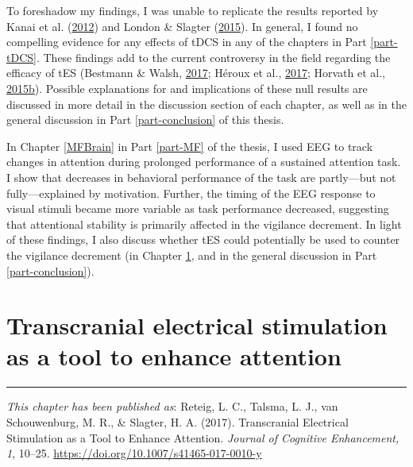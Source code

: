 \documentclass[11pt,]{memoir}
\begin{document}
To foreshadow my findings, I was unable to replicate the results reported by Kanai et al. (\protect\hyperlink{ref-Kanai2012}{2012}) and London \& Slagter (\protect\hyperlink{ref-London2015}{2015}). In general, I found no compelling evidence for any effects of tDCS in any of the chapters in Part \ref{part-tDCS}. These findings add to the current controversy in the field regarding the efficacy of tES (Bestmann \& Walsh, \protect\hyperlink{ref-Bestmann2017}{2017}; Héroux et al., \protect\hyperlink{ref-Heroux2017}{2017}; Horvath et al., \protect\hyperlink{ref-Horvath2015b}{2015}\protect\hyperlink{ref-Horvath2015b}{b}). Possible explanations for and implications of these null results are discussed in more detail in the discussion section of each chapter, as well as in the general discussion in Part \ref{part-conclusion} of this thesis.

In Chapter \ref{MFBrain} in Part \ref{part-MF} of the thesis, I used EEG to track changes in attention during prolonged performance of a sustained attention task. I show that decreases in behavioral performance of the task are partly---but not fully---explained by motivation. Further, the timing of the EEG response to visual stimuli became more variable as task performance decreased, suggesting that attentional stability is primarily affected in the vigilance decrement. In light of these findings, I also discuss whether tES could potentially be used to counter the vigilance decrement (in Chapter \ref{tDCS-att-review}, and in the general discussion in Part \ref{part-conclusion}).

\hypertarget{tDCS-att-review}{%
\chapter{Transcranial electrical stimulation as a tool to enhance attention}\label{tDCS-att-review}}


\vspace*{\fill}

\begin{center}\rule{0.5\linewidth}{\linethickness}\end{center}

\small

\noindent
\emph{This chapter has been published as}: Reteig, L. C., Talsma, L. J., van Schouwenburg, M. R., \& Slagter, H. A. (2017). Transcranial Electrical Stimulation as a Tool to Enhance Attention. \emph{Journal of Cognitive Enhancement, 1}, 10--25. \url{https://doi.org/10.1007/s41465-017-0010-y}
\newpage
\normalsize
\end{document}
